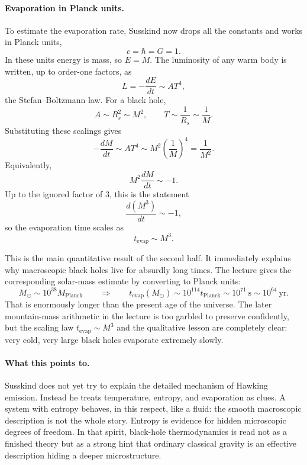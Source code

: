 \paragraph{Evaporation in Planck units.}
To estimate the evaporation rate, Susskind now drops all the constants and works in Planck units,
\begin{equation}
c=\hbar=G=1.
\end{equation}
In these units energy is mass, so \(E=M\). The luminosity of any warm body is written, up to order-one factors, as
\begin{equation}
L=-\frac{dE}{dt}\sim A T^4,
\end{equation}
the Stefan--Boltzmann law. For a black hole,
\begin{equation}
A\sim R_s^2 \sim M^2,
\qquad
T\sim \frac{1}{R_s}\sim \frac{1}{M}.
\end{equation}
Substituting these scalings gives
\begin{equation}
-\frac{dM}{dt}\sim A T^4 \sim M^2\left(\frac{1}{M}\right)^4 = \frac{1}{M^2}.
\end{equation}
Equivalently,
\begin{equation}
M^2\frac{dM}{dt}\sim -1.
\end{equation}
Up to the ignored factor of \(3\), this is the statement
\begin{equation}
\frac{d(M^3)}{dt}\sim -1,
\end{equation}
so the evaporation time scales as
\begin{equation}
t_{\mathrm{evap}}\sim M^3.
\end{equation}

This is the main quantitative result of the second half. It immediately explains why macroscopic black holes live for absurdly long times. The lecture gives the corresponding solar-mass estimate by converting to Planck units:
\begin{equation}
M_\odot \sim 10^{38} M_{\mathrm{Planck}}
\qquad \Longrightarrow \qquad
t_{\mathrm{evap}}(M_\odot)\sim 10^{114} t_{\mathrm{Planck}}
\sim 10^{71}\ \mathrm{s}
\sim 10^{64}\ \mathrm{yr}.
\end{equation}
That is enormously longer than the present age of the universe. The later mountain-mass arithmetic in the lecture is too garbled to preserve confidently, but the scaling law \(t_{\mathrm{evap}}\sim M^3\) and the qualitative lesson are completely clear: very cold, very large black holes evaporate extremely slowly.

\paragraph{What this points to.}
Susskind does not yet try to explain the detailed mechanism of Hawking emission. Instead he treats temperature, entropy, and evaporation as clues. A system with entropy behaves, in this respect, like a fluid: the smooth macroscopic description is not the whole story. Entropy is evidence for hidden microscopic degrees of freedom. In that spirit, black-hole thermodynamics is read not as a finished theory but as a strong hint that ordinary classical gravity is an effective description hiding a deeper microstructure.

